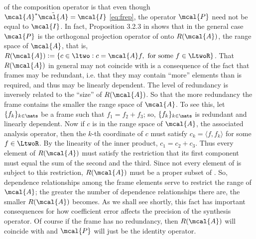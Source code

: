 \documentclass[a4paper, 12pt,preprint]{article}
\newcommand{\inner}[2]{\ensuremath{\langle{#1},{#2}\rangle}\xspace}
\newcommand{\ap}{\ensuremath{\mcal{A}}\xspace}
\begin{document}
\begin{comment}\footnote{A binary operation $\star$ is noncommutative if $A\star B$ is generally not equal to $B\star A$. A classic  example is matrix multiplication.}\end{comment} of the composition operator is that even though $\mcal{A}^*\tilde{\mcal{A}} = \mcal{I}$  \eqref{eq:frep}, the operator $\mcal{P}$   need not be equal to $\mcal{I}$. In fact, Proposition 3.2.3 in \citep{Daubechies1992} shows that in the general case $\mcal{P}$ is the orthogonal projection operator of \ltwo onto $R(\ap)$, the range space of $\mcal{A}$, that is, {$R(\mcal{A}) := \{c \in \ltwo : c = \mcal{A} f, \text{ for some } f \in \LtwoR\}$}.   That $R(\mcal{A})$ in general may not coincide  with \ltwo is a consequence of the fact that  frames  may be redundant, i.e.  that they may contain ``more'' elements than is required, and thus may be linearly dependent. The level of redundancy is inversely related to the ``size'' of  $R(\mcal{A})$. So that the more redundancy the frame contains the smaller the range space of \ap. To see this, let $\{f_k\}_{k \in \nats}$ be a  frame  such that $f_1 = f_2 + f_3$; so, $\{f_k\}_{k \in \nats}$ is redundant and  linearly dependent. Now if $c$ is in the range space of \ap, the associated analysis operator, then  the $k$-th coordinate of $c$ must satisfy $c_k = \inner{f}{f_k}$  for some $f \in \LtwoR$.  By the linearity of the inner product, $c_1 = c_2 + c_3$. Thus every element of $R(\ap)$ must satisfy the restriction that its first component must equal the sum of the second and the third. Since not every element of  \ltwo is subject to this restriction, $R(\ap)$ must be a proper subset of \ltwo. So, dependence relationships among the frame elements serve to restrict the range of \ap; the greater the number of dependence relationships there are, the smaller $R(\ap)$ becomes.   As we shall see shortly, this fact has important consequences for how coefficient error affects the precision of the synthesis operator. Of course if the frame has no redundancy, then $R(\mcal{A})$   will coincide with \ltwo and $\mcal{P}$ will just be the identity operator. 
\end{document}
